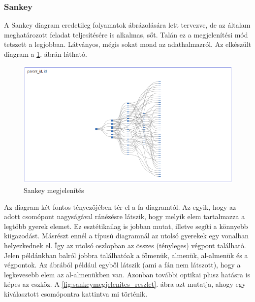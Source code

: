 		\subsubsection{Sankey}
		A Sankey diagram eredetileg folyamatok ábrázolására lett tervezve, de az általam meghatározott feladat teljesítésére is alkalmas, sőt. Talán ez a megjelenítési mód tetszett a legjobban. Látványos, mégis sokat mond az adathalmazról. Az elkészült diagram a \ref{fig:sankeymegjelenites}. ábrán látható.	

		\begin{figure}[h!]
			\centering
			\includegraphics[width=1.0\linewidth]{keve_imgs/sankeymegjelenites}
			\caption{Sankey megjelenítés}
			\label{fig:sankeymegjelenites}
		\end{figure}	

		Az diagram két fontos tényezőjében tér el a fa diagramtól. Az egyik, hogy az adott csomópont nagyságával ránézésre látszik, hogy melyik elem tartalmazza a legtöbb gyerek elemet. Ez esztétikailag is jobban mutat, illetve segíti a könnyebb kiigazodást. Másrészt ennél a típusú diagramnál az utolsó gyerekek egy vonalban helyezkednek el. Így az utolsó oszlopban az összes (tényleges) végpont található. Jelen példánkban balról jobbra találhatóak a főmenük, almenük, al-almenük és a végpontok. Az ábrából például egyből látszik (ami a fán nem látszott), hogy a legkevesebb elem az al-almenükben van. Azonban további optikai plusz hatásra is képes az eszköz. A \ref{fig:sankeymegjelenites_reszlet}. ábra azt mutatja, ahogy egy kiválasztott csomópontra kattintva mi történik.
		
		\pagebreak	
		
